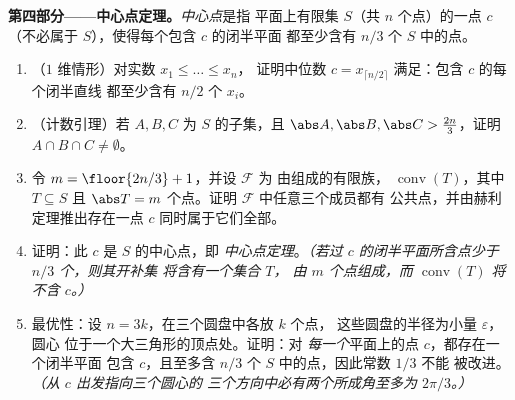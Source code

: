 \begin{problem}
\medskip
\noindent\textbf{第四部分——中心点定理。}\emph{中心点}是指
平面上有限集 $S$（共 $n$ 个点）的一点
$c$（不必属于 $S$），使得每个包含 $c$ 的闭半平面
都至少含有 $n/3$ 个
$S$ 中的点。
\begin{enumerate}[resume]
  \item （$1$ 维情形）对实数 $x_1 \leq \dots \leq x_n$，
        证明中位数 $c = x_{\lceil n/2 \rceil}$
        满足：包含 $c$ 的每个闭半直线
        都至少含有 $n/2$ 个 $x_i$。
  \item （计数引理）若 $A, B, C$ 为 $S$ 的子集，且
        $\abs A, \abs B, \abs C > \tfrac{2n}3$，证明 $A \cap
        B \cap C \neq \emptyset$。
  \item 令 $m = \floor{2n/3} + 1$，并设 $\mathcal F$ 为
        由组成的有限族，
        $\operatorname{conv}(T)$，其中 $T \subseteq S$ 且 $\abs T =
        m$ 个点。证明 $\mathcal F$ 中任意三个成员都有
        公共点，并由赫利定理推出存在一点 $c$
        同时属于它们全部。
  \item 证明：此 $c$ 是 $S$ 的中心点，即
        \emph{中心点定理}。\emph{（若过
        $c$ 的闭半平面所含点少于 $n/3$ 个，则其开补集
        将含有一个集合 $T$，
        由 $m$ 个点组成，而 $\operatorname{conv}(T)$ 将
        不含 $c$。）}
  \item 最优性：设 $n = 3k$，在三个圆盘中各放 $k$ 个点，
        这些圆盘的半径为小量 $\varepsilon$，圆心
        位于一个大三角形的顶点处。证明：对
        \emph{每一个}平面上的点 $c$，都存在一个闭半平面
        包含 $c$，且至多含 $n/3$ 个
        $S$ 中的点，因此常数 $1/3$ 不能
        被改进。\emph{（从 $c$ 出发指向三个圆心的
        三个方向中必有两个所成角至多为
        $2\pi/3$。）}
\end{enumerate}


\end{problem}
